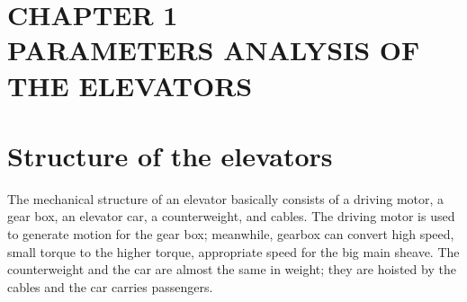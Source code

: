 \newpage
{} %
\section*{CHAPTER 1\\ \vspace{0.5cm} PARAMETERS ANALYSIS OF THE ELEVATORS}



\section{Structure of the elevators}

    

The mechanical structure of an elevator basically consists of a driving motor, a gear box, an elevator car, a counterweight, and cables. The driving motor is used to generate motion for the gear box; meanwhile, gearbox can convert high speed, small torque to the higher torque, appropriate speed for the big main sheave. The counterweight and the car are almost the same in weight; they are hoisted by the cables and the car carries passengers.




